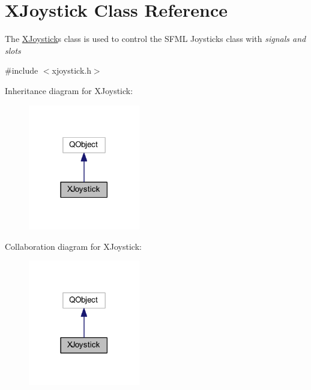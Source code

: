 \hypertarget{class_x_joystick}{}\section{X\+Joystick Class Reference}
\label{class_x_joystick}


The \hyperlink{class_x_joystick}{X\+Joystick}\textquotesingle{}s class is used to control the S\+F\+M\+L Joystick\textquotesingle{}s class with {\itshape signals and slots}  




{\ttfamily \#include $<$xjoystick.\+h$>$}



Inheritance diagram for X\+Joystick\+:\nopagebreak
\begin{figure}[H]
\begin{center}
\leavevmode
\includegraphics[width=138pt]{d2/d42/class_x_joystick__inherit__graph}
\end{center}
\end{figure}


Collaboration diagram for X\+Joystick\+:\nopagebreak
\begin{figure}[H]
\begin{center}
\leavevmode
\includegraphics[width=138pt]{d6/da2/class_x_joystick__coll__graph}
\end{center}
\end{figure}
